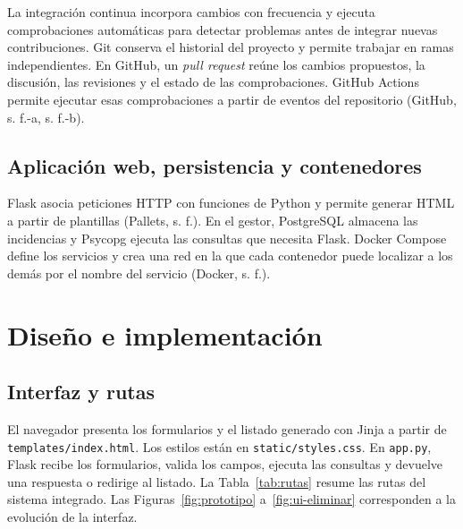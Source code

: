 \documentclass[12pt,letterpaper]{article}
\begin{document}
La integración continua incorpora cambios con frecuencia y ejecuta comprobaciones automáticas para detectar problemas antes de integrar nuevas contribuciones. Git conserva el historial del proyecto y permite trabajar en ramas independientes. En GitHub, un \textit{pull request} reúne los cambios propuestos, la discusión, las revisiones y el estado de las comprobaciones. GitHub Actions permite ejecutar esas comprobaciones a partir de eventos del repositorio (GitHub, s. f.-a, s. f.-b).

\subsection{Aplicación web, persistencia y contenedores}

Flask asocia peticiones HTTP con funciones de Python y permite generar HTML a partir de plantillas (Pallets, s. f.). En el gestor, PostgreSQL almacena las incidencias y Psycopg ejecuta las consultas que necesita Flask. Docker Compose define los servicios y crea una red en la que cada contenedor puede localizar a los demás por el nombre del servicio (Docker, s. f.).

\section{Diseño e implementación}

\subsection{Interfaz y rutas}

El navegador presenta los formularios y el listado generado con Jinja a partir de \texttt{templates/index.html}. Los estilos están en \texttt{static/styles.css}. En \texttt{app.py}, Flask recibe los formularios, valida los campos, ejecuta las consultas y devuelve una respuesta o redirige al listado. La Tabla~\ref{tab:rutas} resume las rutas del sistema integrado. Las Figuras~\ref{fig:prototipo} a~\ref{fig:ui-eliminar} corresponden a la evolución de la interfaz.
\end{document}

